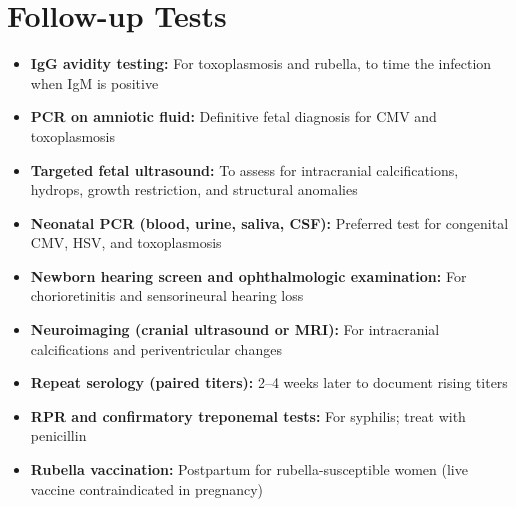 \section*{Follow-up Tests}
\begin{itemize}
  \item \textbf{IgG avidity testing:} For toxoplasmosis and rubella, to time the infection when IgM is positive
  \item \textbf{PCR on amniotic fluid:} Definitive fetal diagnosis for CMV and toxoplasmosis
  \item \textbf{Targeted fetal ultrasound:} To assess for intracranial calcifications, hydrops, growth restriction, and structural anomalies
  \item \textbf{Neonatal PCR (blood, urine, saliva, CSF):} Preferred test for congenital CMV, HSV, and toxoplasmosis
  \item \textbf{Newborn hearing screen and ophthalmologic examination:} For chorioretinitis and sensorineural hearing loss
  \item \textbf{Neuroimaging (cranial ultrasound or MRI):} For intracranial calcifications and periventricular changes
  \item \textbf{Repeat serology (paired titers):} 2--4 weeks later to document rising titers
  \item \textbf{RPR and confirmatory treponemal tests:} For syphilis; treat with penicillin
  \item \textbf{Rubella vaccination:} Postpartum for rubella-susceptible women (live vaccine contraindicated in pregnancy)
\end{itemize}

